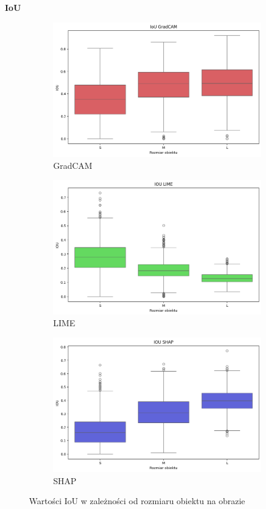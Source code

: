 \textbf{IoU}
\begin{figure}
	\centering
	\begin{subfigure}[b]{0.3\textwidth}
		\centering\includegraphics[width=.9\textwidth]{img/size_iou_gradcam}
		\caption{GradCAM}  \label{rys:size_iou_gradcam}
	\end{subfigure}
	\begin{subfigure}[b]{0.3\textwidth}
		\centering\includegraphics[width=.9\textwidth]{img/size_iou_lime}
		\caption{LIME}  \label{rys:size_iou_lime}
	\end{subfigure}
	\begin{subfigure}[b]{0.3\textwidth}
		\centering\includegraphics[width=.9\textwidth]{img/size_iou_shap}
		\caption{SHAP}  \label{rys:size_iou_shap}
	\end{subfigure}
	\caption{Wartości IoU w zależności od rozmiaru obiektu na obrazie}
\end{figure}

